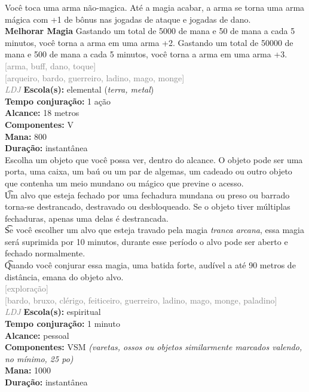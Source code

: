 \documentclass{RPG_Adventure}[2021/10/20]
\begin{document}
{\normalsize Você toca uma arma não-magica. Até a magia acabar, a arma se torna uma arma mágica com +1 de bônus nas jogadas de ataque e jogadas de dano.\\\t \textbf{Melhorar Magia} Gastando um total de 5000 de mana e 50 de mana a cada 5 minutos, você torna a arma em uma arma +2. Gastando um total de 50000 de mana e 500 de mana a cada 5 minutos, você torna a arma em uma arma +3.\\}
{\scriptsize \textcolor{gray}{[arma, buff, dano, toque]\\}}
{\scriptsize \textcolor{gray}{[arqueiro, bardo, guerreiro, ladino, mago, monge]\\}}
{\tiny \textcolor{gray}{\textit{LDJ}}}
{\small \t \textbf{Escola(s):} elemental (\textit{terra, metal})\\\t \textbf{Tempo conjuração:} 1 ação\\\t \textbf{Alcance:} 18 metros\\\t \textbf{Componentes:} V\\\t \textbf{Mana:} 800\\\t \textbf{Duração:} instantânea\\}
{\normalsize Escolha um objeto que você possa ver, dentro do alcance. O objeto pode ser uma porta, uma caixa, um baú ou um par de algemas, um cadeado ou outro objeto que contenha um meio mundano ou mágico que previne o acesso.\\\t Um alvo que esteja fechado por uma fechadura mundana ou preso ou barrado torna-se destrancado, destravado ou desbloqueado. Se o objeto tiver múltiplas fechaduras, apenas uma delas é destrancada.\\\t Se você escolher um alvo que esteja travado pela magia \textit{tranca arcana}, essa magia será suprimida por 10 minutos, durante esse período o alvo pode ser aberto e fechado normalmente.\\\t Quando você conjurar essa magia, uma batida forte, audível a até 90 metros de distância, emana do objeto alvo.\\}
{\scriptsize \textcolor{gray}{[exploração]\\}}
{\scriptsize \textcolor{gray}{[bardo, bruxo, clérigo, feiticeiro, guerreiro, ladino, mago, monge, paladino]\\}}
{\tiny \textcolor{gray}{\textit{LDJ}}}
{\small \t \textbf{Escola(s):} espiritual\\\t \textbf{Tempo conjuração:} 1 minuto\\\t \textbf{Alcance:} pessoal\\\t \textbf{Componentes:} VSM \textit{(varetas, ossos ou objetos similarmente marcados valendo, no mínimo, 25 po)}\\\t \textbf{Mana:} 1000\\\t \textbf{Duração:} instantânea\\}
\end{document}
